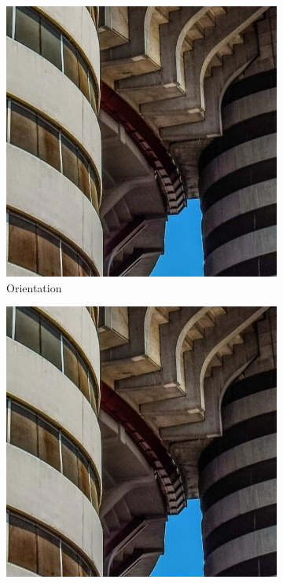 \begin{figure}[ht]
    \begin{subfigure}[b]{0.24\textwidth}
        \includegraphics[width=\textwidth]{img/Original.jpg}
        \caption{Orientation}
        \label{fig:orientation}
    \end{subfigure}
    \hfill
    \begin{subfigure}[b]{0.24\textwidth}
        \includegraphics[width=\textwidth]{img/Original.jpg}

\end{subfigure}
\end{figure}
